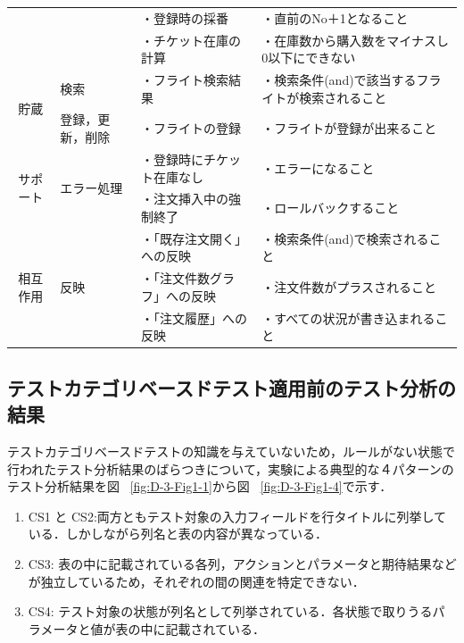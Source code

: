 \begin{table}[htbp]
\begin{tabular}{|c|l|p{10.5em}|p{13em}|}
          &       & ・登録時の採番 & ・直前のNo＋1となること \\
          &       & ・チケット在庫の計算 & ・在庫数から購入数をマイナスし0以下にできない \\
    \hline
    \multicolumn{1}{|c|}{\multirow{2}[4]{*}{貯蔵}} & \multicolumn{1}{p{7.75em}|}{検索} & ・フライト検索結果 & ・検索条件(and)で該当するフライトが検索されること \bigstrut\\
\cline{2-4}          & \multicolumn{1}{p{7.75em}|}{登録，更新，削除} & ・フライトの登録 & ・フライトが登録が出来ること \bigstrut\\
    \hline
    \multicolumn{1}{|c|}{\multirow{2}[2]{*}{サポート}} & \multicolumn{1}{l|}{\multirow{2}[2]{*}{エラー処理}} & ・登録時にチケット在庫なし & ・エラーになること\bigstrut[t]\\
          &       & ・注文挿入中の強制終了 & ・ロールバックすること \bigstrut[b]\\
    \hline
    \multicolumn{1}{|c|}{\multirow{3}[2]{*}{相互作用}} & \multicolumn{1}{l|}{\multirow{3}[2]{*}{反映}} & ・「既存注文開く」への反映 & ・検索条件(and)で検索されること \bigstrut[t]\\
          &       & ・「注文件数グラフ」への反映 & ・注文件数がプラスされること \\
          &       & ・「注文履歴」への反映 & ・すべての状況が書き込まれること \bigstrut[b]\\
    \hline
    \end{tabular}%
  \label{tab:D-3-ensyu2}%
\end{table}%

\subsection{テストカテゴリベースドテスト適用前のテスト分析の結果}

テストカテゴリベースドテストの知識を与えていないため，ルールがない状態で行われたテスト分析結果のばらつきについて，実験による典型的な４パターンのテスト分析結果を図 ~\ref{fig:D-3-Fig1-1}から図 ~\ref{fig:D-3-Fig1-4}で示す．
\begin{enumerate}
\item CS1 と CS2:両方ともテスト対象の入力フィールドを行タイトルに列挙している．しかしながら列名と表の内容が異なっている．
\item CS3: 表の中に記載されている各列，アクションとパラメータと期待結果などが独立しているため，それぞれの間の関連を特定できない．
\item CS4: テスト対象の状態が列名として列挙されている．各状態で取りうるパラメータと値が表の中に記載されている．
\end{enumerate}

